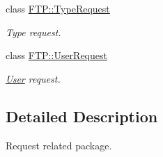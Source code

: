\begin{DoxyCompactItemize}
class \hyperlink{classFTP_1_1TypeRequest}{F\-T\-P\-::\-Type\-Request}
\begin{DoxyCompactList}\small\item\em Type request. \end{DoxyCompactList}\item 
class \hyperlink{classFTP_1_1UserRequest}{F\-T\-P\-::\-User\-Request}
\begin{DoxyCompactList}\small\item\em \hyperlink{structFTP_1_1User}{User} request. \end{DoxyCompactList}\end{DoxyCompactItemize}


\subsection{Detailed Description}
Request related package. 